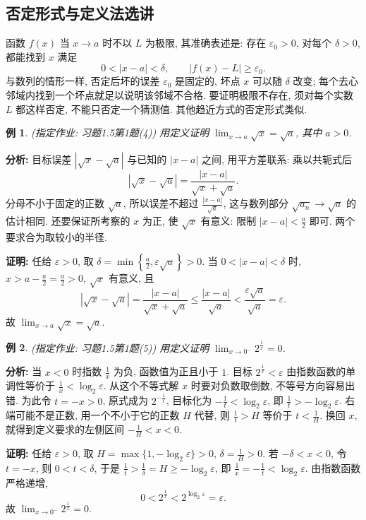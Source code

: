 \documentclass[UTF8,openany]{ctexbook}
\theoremstyle{chinesetextbook}
\newtheorem{example}{例}[section]
\newenvironment{cnproof}{\par\indent\textbf{证明:} \ignorespaces}{\par}
\begin{document}
\subsection{否定形式与定义法选讲}
函数 $f(x)$ 当 $x\to a$ 时不以 $L$ 为极限, 其准确表述是: 存在 $\varepsilon_0>0$, 对每个 $\delta>0$, 都能找到 $x$ 满足
\[
0<|x-a|<\delta,\qquad |f(x)-L|\ge\varepsilon_0.
\]
与数列的情形一样, 否定后坏的误差 $\varepsilon_0$ 是固定的, 坏点 $x$ 可以随 $\delta$ 改变; 每个去心邻域内找到一个坏点就足以说明该邻域不合格. 要证明极限不存在, 须对每个实数 $L$ 都这样否定, 不能只否定一个猜测值. 其他趋近方式的否定形式类似.
\begin{example}
\textnormal{(指定作业: 习题1.5第1题(4))} 用定义证明 $\displaystyle \lim_{x\to a}\sqrt x=\sqrt a$, 其中 $a>0$.
\end{example}
\par\indent\textbf{分析:} 目标误差 $|\sqrt x-\sqrt a|$ 与已知的 $|x-a|$ 之间, 用平方差联系: 乘以共轭式后
\[
|\sqrt x-\sqrt a|=\frac{|x-a|}{\sqrt x+\sqrt a}.
\]
分母不小于固定的正数 $\sqrt a$, 所以误差不超过 $\displaystyle\frac{|x-a|}{\sqrt a}$, 这与数列部分 $\sqrt{a_n}\to\sqrt a$ 的估计相同. 还要保证所考察的 $x$ 为正, 使 $\sqrt x$ 有意义: 限制 $\displaystyle|x-a|<\frac a2$ 即可. 两个要求合为取较小的半径.
\begin{cnproof}
任给 $\varepsilon>0$, 取 $\displaystyle\delta=\min\left\{\frac a2,\varepsilon\sqrt a\right\}>0$. 当 $0<|x-a|<\delta$ 时, $\displaystyle x>a-\frac a2=\frac a2>0$, $\sqrt x$ 有意义, 且
\[
|\sqrt x-\sqrt a|=\frac{|x-a|}{\sqrt x+\sqrt a}
\le\frac{|x-a|}{\sqrt a}<\frac{\varepsilon\sqrt a}{\sqrt a}=\varepsilon.
\]
故 $\displaystyle\lim_{x\to a}\sqrt x=\sqrt a$.
\end{cnproof}
\begin{example}
\textnormal{(指定作业: 习题1.5第1题(5))} 用定义证明 $\displaystyle \lim_{x\to0^-}2^{\frac1x}=0$.
\end{example}
\par\indent\textbf{分析:} 当 $x<0$ 时指数 $\displaystyle\frac1x$ 为负, 函数值为正且小于 $1$. 目标 $\displaystyle2^{\frac1x}<\varepsilon$ 由指数函数的单调性等价于 $\displaystyle\frac1x<\log_2\varepsilon$. 从这个不等式解 $x$ 时要对负数取倒数, 不等号方向容易出错. 为此令 $t=-x>0$, 原式成为 $2^{-\frac1t}$, 目标化为 $\displaystyle-\frac1t<\log_2\varepsilon$, 即 $\displaystyle\frac1t>-\log_2\varepsilon$. 右端可能不是正数, 用一个不小于它的正数 $H$ 代替, 则 $\displaystyle\frac1t>H$ 等价于 $\displaystyle t<\frac1H$. 换回 $x$, 就得到定义要求的左侧区间 $\displaystyle-\frac1H<x<0$.
\begin{cnproof}
任给 $\varepsilon>0$, 取 $H=\max\{1,-\log_2\varepsilon\}>0$, $\displaystyle\delta=\frac1H>0$. 若 $-\delta<x<0$, 令 $t=-x$, 则 $0<t<\delta$, 于是 $\displaystyle\frac1t>\frac1\delta=H\ge-\log_2\varepsilon$, 即 $\displaystyle\frac1x=-\frac1t<\log_2\varepsilon$. 由指数函数严格递增,
\[
0<2^{\frac1x}<2^{\log_2\varepsilon}=\varepsilon.
\]
故 $\displaystyle\lim_{x\to0^-}2^{\frac1x}=0$.
\end{cnproof}
\end{document}
